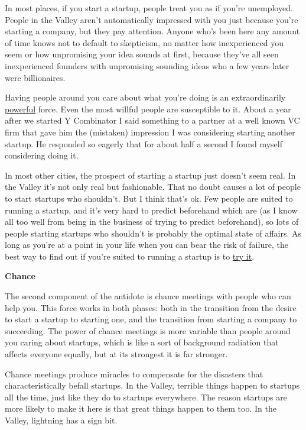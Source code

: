 \documentclass[12pt]{book}
\begin{document}
In most places, if you start a startup, people treat you as if you're
unemployed. People in the Valley aren't automatically impressed with you
just because you're starting a company, but they pay attention. Anyone
who's been here any amount of time knows not to default to skepticism,
no matter how inexperienced you seem or how unpromising your idea sounds
at first, because they've all seen inexperienced founders with
unpromising sounding ideas who a few years later were billionaires.

Having people around you care about what you're doing is an
extraordinarily \href{cities.html}{powerful} force. Even the most
willful people are susceptible to it. About a year after we started Y
Combinator I said something to a partner at a well known VC firm that
gave him the (mistaken) impression I was considering starting another
startup. He responded so eagerly that for about half a second I found
myself considering doing it.

In most other cities, the prospect of starting a startup just doesn't
seem real. In the Valley it's not only real but fashionable. That no
doubt causes a lot of people to start startups who shouldn't. But I
think that's ok. Few people are suited to running a startup, and it's
very hard to predict beforehand which are (as I know all too well from
being in the business of trying to predict beforehand), so lots of
people starting startups who shouldn't is probably the optimal state of
affairs. As long as you're at a point in your life when you can bear the
risk of failure, the best way to find out if you're suited to running a
startup is to \href{notnot.html}{try it}.

\textbf{Chance}

The second component of the antidote is chance meetings with people who
can help you. This force works in both phases: both in the transition
from the desire to start a startup to starting one, and the transition
from starting a company to succeeding. The power of chance meetings is
more variable than people around you caring about startups, which is
like a sort of background radiation that affects everyone equally, but
at its strongest it is far stronger.

Chance meetings produce miracles to compensate for the disasters that
characteristically befall startups. In the Valley, terrible things
happen to startups all the time, just like they do to startups
everywhere. The reason startups are more likely to make it here is that
great things happen to them too. In the Valley, lightning has a sign
bit.
\end{document}
